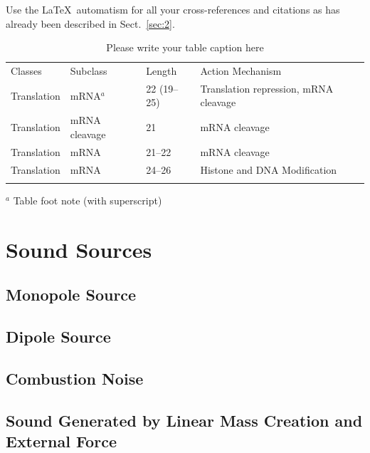 \documentclass[graybox]{svmult}
\begin{document}
 Use the \LaTeX\ automatism for all your cross-refer\-ences and citations as has already been described in Sect.~\ref{sec:2}.
%
%
\begin{table}[!t]
\caption{Please write your table caption here}
\label{tab:1}       %
%
%
\begin{tabular}{p{2cm}p{2.4cm}p{2cm}p{4.9cm}}
\hline\noalign{\smallskip}
Classes & Subclass & Length & Action Mechanism  \\
\noalign{\smallskip}\svhline\noalign{\smallskip}
Translation & mRNA$^a$  & 22 (19--25) & Translation repression, mRNA cleavage\\
Translation & mRNA cleavage & 21 & mRNA cleavage\\
Translation & mRNA  & 21--22 & mRNA cleavage\\
Translation & mRNA  & 24--26 & Histone and DNA Modification\\
\noalign{\smallskip}\hline\noalign{\smallskip}
\end{tabular}
$^a$ Table foot note (with superscript)
\end{table}
%

\section{Sound Sources}
\label{sec:6}

\subsection{Monopole Source}
\label{subsec:2}

\subsection{Dipole Source}
\label{subsec:2}

\subsection{Combustion Noise}
\label{subsec:2}

\subsection{Sound Generated by Linear Mass Creation and External Force}
\label{subsec:2}
\end{document}
